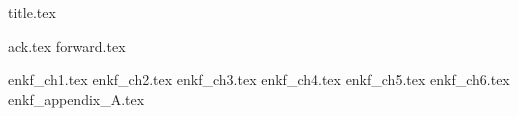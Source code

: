 \documentclass[12pt,letterpaper,oneside]{scrbook}
\begin{document}
\frontmatter
{title.tex}

\clearpage
\thispagestyle{empty}
{ack.tex}
{forward.tex}
 
\tableofcontents

\mainmatter
{enkf_ch1.tex}
{enkf_ch2.tex}
{enkf_ch3.tex}
{enkf_ch4.tex}
{enkf_ch5.tex}
{enkf_ch6.tex}
\appendix
{enkf_appendix_A.tex}


\backmatter



\end{document}

